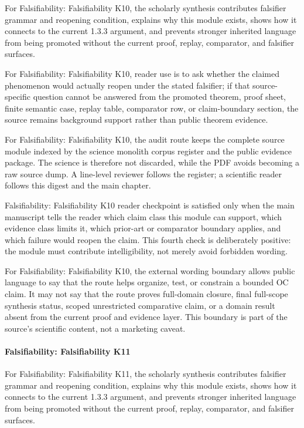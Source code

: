 For Falsifiability: Falsifiability K10, the scholarly synthesis contributes falsifier grammar and reopening condition, explains why this module exists, shows how it connects to the current 1.3.3 argument, and prevents stronger inherited language from being promoted without the current proof, replay, comparator, and falsifier surfaces.


For Falsifiability: Falsifiability K10, reader use is to ask whether the claimed phenomenon would actually reopen under the stated falsifier; if that source-specific question cannot be answered from the promoted theorem, proof sheet, finite semantic case, replay table, comparator row, or claim-boundary section, the source remains background support rather than public theorem evidence.


For Falsifiability: Falsifiability K10, the audit route keeps the complete source module indexed by the science monolith corpus register and the public evidence package. The science is therefore not discarded, while the PDF avoids becoming a raw source dump. A line-level reviewer follows the register; a scientific reader follows this digest and the main chapter.


Falsifiability: Falsifiability K10 reader checkpoint is satisfied only when the main manuscript tells the reader which claim class this module can support, which evidence class limits it, which prior-art or comparator boundary applies, and which failure would reopen the claim. This fourth check is deliberately positive: the module must contribute intelligibility, not merely avoid forbidden wording.


For Falsifiability: Falsifiability K10, the external wording boundary allows public language to say that the route helps organize, test, or constrain a bounded OC claim. It may not say that the route proves full-domain closure, final full-scope synthesis status, scoped unrestricted comparative claim, or a domain result absent from the current proof and evidence layer. This boundary is part of the source's scientific content, not a marketing caveat.


\paragraph{Falsifiability: Falsifiability K11}

For Falsifiability: Falsifiability K11, the scholarly synthesis contributes falsifier grammar and reopening condition, explains why this module exists, shows how it connects to the current 1.3.3 argument, and prevents stronger inherited language from being promoted without the current proof, replay, comparator, and falsifier surfaces.


